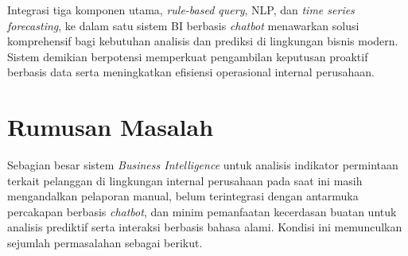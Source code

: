 Integrasi tiga komponen utama, \textit{rule-based query}, NLP, dan \textit{time series forecasting}, ke dalam satu sistem BI berbasis \textit{chatbot} menawarkan solusi komprehensif bagi kebutuhan analisis dan prediksi di lingkungan bisnis modern. Sistem demikian berpotensi memperkuat pengambilan keputusan proaktif berbasis data serta meningkatkan efisiensi operasional internal perusahaan.

\section{Rumusan Masalah}

Sebagian besar sistem \textit{Business Intelligence} untuk analisis indikator permintaan terkait pelanggan di lingkungan internal perusahaan pada saat ini masih mengandalkan pelaporan manual, belum terintegrasi dengan antarmuka percakapan berbasis \textit{chatbot}, dan minim pemanfaatan kecerdasan buatan untuk analisis prediktif serta interaksi berbasis bahasa alami. Kondisi ini memunculkan sejumlah permasalahan sebagai berikut.

